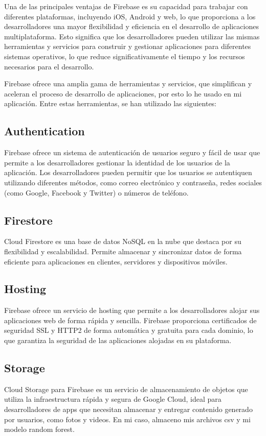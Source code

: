 Una de las principales ventajas de Firebase es su capacidad para trabajar con diferentes plataformas, incluyendo iOS, Android y web, lo que proporciona a los desarrolladores una mayor flexibilidad y eficiencia en el desarrollo de aplicaciones multiplataforma. Esto significa que los desarrolladores pueden utilizar las mismas herramientas y servicios para construir y gestionar aplicaciones para diferentes sistemas operativos, lo que reduce significativamente el tiempo y los recursos necesarios para el desarrollo.

Firebase ofrece una amplia gama de herramientas y servicios, que simplifican y aceleran el proceso de desarrollo de aplicaciones, por esto lo he usado en mi aplicación. Entre estas herramientas, se han utilizado las siguientes:

\subsection{Authentication}
Firebase ofrece un sistema de autenticación de usuarios seguro y fácil de usar que permite a los desarrolladores gestionar la identidad de los usuarios de la aplicación. Los desarrolladores pueden permitir que los usuarios se autentiquen utilizando diferentes métodos, como correo electrónico y contraseña, redes sociales (como Google, Facebook y Twitter) o números de teléfono.

\subsection{Firestore}
Cloud Firestore \cite{firestore} es una base de datos NoSQL en la nube que destaca por su flexibilidad y escalabilidad. Permite almacenar y sincronizar datos de forma eficiente para aplicaciones en clientes, servidores y dispositivos móviles.

\subsection{Hosting}
Firebase ofrece un servicio de hosting que permite a los desarrolladores alojar sus aplicaciones web de forma rápida y sencilla. Firebase proporciona certificados de seguridad SSL y HTTP2 de forma automática y gratuita para cada dominio, lo que garantiza la seguridad de las aplicaciones alojadas en su plataforma.

\subsection{Storage}
Cloud Storage \cite{storage} para Firebase es un servicio de almacenamiento de objetos que utiliza la infraestructura rápida y segura de Google Cloud, ideal para desarrolladores de apps que necesitan almacenar y entregar contenido generado por usuarios, como fotos y videos. En mi caso, almaceno mis archivos csv y mi modelo random forest.

